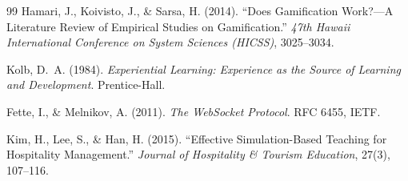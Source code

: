 \documentclass[12pt,a4paper,openany]{report}
\begin{document}
\begin{thebibliography}{99}
Hamari, J., Koivisto, J., \& Sarsa, H. (2014).
``Does Gamification Work?---A Literature Review of Empirical Studies on Gamification.''
\textit{47th Hawaii International Conference on System Sciences (HICSS)}, 3025--3034.

Kolb, D.~A. (1984).
\textit{Experiential Learning: Experience as the Source of Learning and Development}.
Prentice-Hall.

Fette, I., \& Melnikov, A. (2011).
\textit{The WebSocket Protocol}.
RFC 6455, IETF.

Kim, H., Lee, S., \& Han, H. (2015).
``Effective Simulation-Based Teaching for Hospitality Management.''
\textit{Journal of Hospitality \& Tourism Education}, 27(3), 107--116.

\end{thebibliography}
\end{document}
